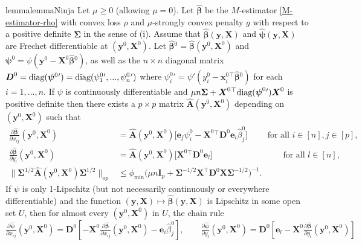 \documentclass[11pt]{amsart}
\numberwithin{equation}{section}
\numberwithin{equation}{section}
\def\diag{\hbox{\rm diag}}
\def\mathbold{\boldsymbol} %
\def\bA{\mathbold{A}}\def\calA{{\cal A}}\def\scrA{{\mathscr A}}\def\Ahat{\widehat{A}}\def\Atil{{\widetilde A}}
\def\hbA{{\widehat{\bA}}}\def\tbA{{\widetilde{\bA}}}
\def\bD{\mathbold{D}}\def\calD{{\cal D}}\def\scrD{{\mathscr D}}\def\Dhat{\widehat{D}}\def\Dtil{{\widetilde D}}
\def\bI{\mathbold{I}}\def\hbI{{\widehat{\bI}}}\def\tbI{{\widetilde{\bI}}}
\def\be{\mathbold{e}}
\def\bx{\mathbold{x}}\def\xhat{\widehat{x}}\def\xtil{\widetilde{x}}\def\xbar{{\overline x}}\def\vbx{{\bf x}}
\def\bX{\mathbold{X}}\def\hbX{{\widehat{\bX}}}\def\tbX{{\widetilde{\bX}}}\def\bXbar{{\overline \bX}}
\def\by{\mathbold{y}}\def\yhat{\widehat{y}}\def\ytil{\widetilde{y}}\def\ybar{{\overline y}}\def\vby{{\bf y}}
\def\bbeta{\mathbold{\beta}}\def\betahat{\widehat{\beta}}\def\hbeta{\widehat{\beta}}
\def\hbbeta{{{\widehat{\bbeta}}}}
\def\bSigma{\mathbold{\Sigma}}\def\hbSigma{{\widehat{\bSigma}}}
\def\bpsi{\mathbold{\psi}}\def\psihat{\widehat{\psi}}\def\hpsi{\widehat{\psi}}
\def\hbpsi{{\widehat{\bpsi}}}\def\tbpsi{{\widetilde{\bpsi}}}
\def\calD{{\cal D}}
\begin{document}
{\begin{restatable}{lemma}{lemmaNinja}
    \label{lemma:ninja-variant}
    Let $\mu\ge 0$ (allowing $\mu=0$).
    Let $\hbbeta$ 
    be the $M$-estimator \eqref{M-estimator-rho}
    with convex loss $\rho$
    and $\mu$-strongly convex penalty $g$
    with respect to a positive definite $\bSigma$
    in the sense of (i).
    Assume that $\hbbeta(\by,\bX)$
    and $\hbpsi(\by,\bX)$
    are Frechet
    differentiable at $(\by^0,\bX^0)$.
    Let $\hbbeta{}^0 = \hbbeta(\by^0,\bX^0)$
    and $\bpsi^0 = \psi(\by^0-\bX^0\hbbeta{}^0)$,
    as well as
    the $n\times n$ diagonal matrix
    $\bD^0=
    \diag(\bpsi{}^0{}') = \diag(\psi_1^0{}', ..., \psi_n^0{}')$
    where $\psi_i^0{}' = \psi'(y_i^0-\bx_i^0{}^\top\hbbeta{}^0)$ for each $i=1,...,n$.
    If $\psi$ is continuously differentiable
    and $\mu n \bSigma + \bX^0{}^\top\diag(\bpsi^0{}')\bX^0$ is positive
    definite then there exists a $p\times p$ matrix
    $\hbA{}(\by^0,\bX^0)$
    depending on $(\by^0,\bX^0)$ such that
    \begin{align}
    \tfrac{\partial \hbbeta}{\partial x_{ij}}
    (\by^0,\bX^0)
    &= \hbA(\by^0,\bX^0)\bigl[\be_j\psi_i^0 - \bX^0{}^\top\bD^0\be_i \hbeta_j^0\bigr]
    \qquad \text{ for all } i\in[n],j\in[p],
    \label{eq:derivatives-X}
    \\
    \tfrac{\partial \hbbeta}{\partial y_{l}}
    (\by^0,\bX^0)
    &= \hbA(\by^0,\bX^0)\bigl[\bX^0{}^\top\bD^0\be_l\bigr]
    \qquad\qquad\qquad\qquad \text{ for all } l\in[n],
    \label{eq:derivatives-y}
    \\
        \|\bSigma^{1/2}\hbA{}(\by^0,\bX^0)\bSigma^{1/2}\|_{op}
    &\le \phi_{\min}\bigl(\mu n \bI_p + \bSigma^{-1/2}\bX^\top \bD^0\bX\bSigma^{-1/2} \bigr)^{-1}.
    \label{eq:hbA-op}
    \end{align}
    If $\psi$ is only 1-Lipschitz (but not necessarily continuously
    or everywhere differentiable)
    and the function
    $(\by,\bX)\mapsto \hbbeta(\by,\bX)$ is Lipschitz
    in some open set $U$, then
    for almost every $(\by^0,\bX^0)$ in $U$,
    the chain rule
    \begin{equation}
        \label{eq:chain-rule-hard}
    \tfrac{\partial\hbpsi}{\partial x_{ij}}(\by^0,\bX^0)
    =\bD^0[-\bX^0\tfrac{\partial\hbbeta}{\partial x_{ij}}(\by^0,\bX^0) - \be_i \hbeta_j^0],
    \qquad
    \tfrac{\partial\hbpsi}{\partial y_l}(\by^0,\bX^0)
    =\bD^0[\be_l-\bX^0\tfrac{\partial\hbbeta}{\partial y_l}(\by^0,\bX^0)]
    \end{equation}

\end{restatable}}
\end{document}
